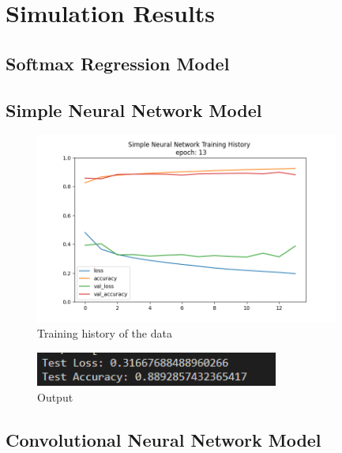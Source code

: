\documentclass{article}
\begin{document}
\newpage
\section{Simulation Results}

\subsection{Softmax Regression Model}



\subsection{Simple Neural Network Model}

\begin{figure}[h]
    \caption{Training history of the data}
    \centering
    \includegraphics[width=10cm]{imgFolder/simpleNeuralNetwork_fig.png}
\end{figure}

\begin{figure}[h]
    \caption{Output}
    \centering
    \includegraphics[width=8cm]{imgFolder/simpleNeuralNetworkResult.png}
\end{figure}

\subsection{Convolutional Neural Network Model}
\end{document}
